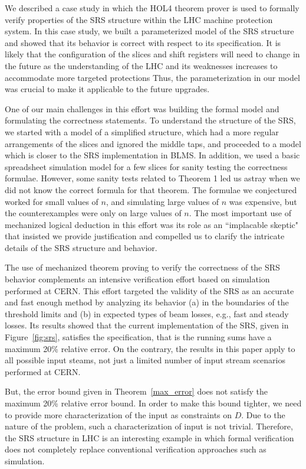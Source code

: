 \documentclass{llncs}
\begin{document}
We described a case study in which the HOL4 theorem prover is used to formally verify properties of the SRS structure within the LHC machine protection system.
In this case study, we built a parameterized model of the SRS structure and showed that its behavior is correct with respect to its specification.
It is likely that the configuration of the slices and shift registers will need to change in the future as the understanding of the LHC and its weaknesses increases to accommodate more targeted protections
Thus, the parameterization in our model was crucial to make it applicable to the future upgrades.

One of our main challenges in this effort was building the formal model and formulating the correctness statements.
To understand the structure of the SRS, we started with a model of a simplified structure, which had a more regular arrangements of the slices and ignored the middle taps, and proceeded to a model which is closer to the SRS implementation in BLMS.
In addition, we used a basic spreadsheet simulation model for a few slices for sanity testing the correctness formulae.
However, some sanity tests related to Theorem 1 led us astray when we did not know the correct formula for that theorem.
The formulae we conjectured worked for small values of $n$, and simulating large values of $n$ was expensive, but the counterexamples were only on large values of $n$.
The most important use of mechanized logical deduction in this effort was its role as an ``implacable skeptic" that insisted we provide justification and compelled us to clarify the intricate details of the SRS structure and behavior.

The use of mechanized theorem proving to verify the correctness of the SRS behavior complements an intensive verification effort based on simulation performed at CERN.
This effort targeted the validity of the SRS as an accurate and fast enough method by analyzing its behavior (a) in the boundaries of the threshold limits and (b) in expected types of beam losses, e.g., fast and steady losses.
Its results showed that the current implementation of the SRS, given in Figure~\ref{fig:srs}, satisfies the specification, that is the running sums have a maximum 20\% relative error.
On the contrary, the results in this paper apply to all possible input steams, not just a limited number of input stream scenarios performed at CERN.

But, the error bound given in Theorem~\ref{max_error} does not satisfy the maximum 20\% relative error bound.
In order to make this bound tighter, we need to provide more characterization of the input as constraints on $D$.
Due to the nature of the problem, such a characterization of input is not trivial.
Therefore, the SRS structure in LHC is an interesting example in which formal verification does not completely replace conventional verification approaches such as simulation.
\end{document}
